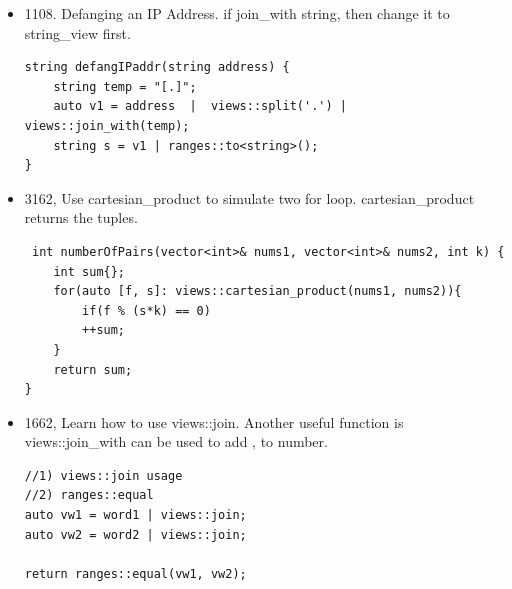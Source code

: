 \documentclass[a4paper,11pt,twoside]{book}
\begin{document}
\begin{itemize}
\begin{lstlisting}
		string v3 = v1 | views::drop(v1.size() -4) | views::chunk(2) | views::join_with('-') | ranges::to<string>();;
		result = v2 + '-' + v3;
		
	}
	else{
		result = v1 | views::chunk(3) | views::join_with('-') | ranges::to<string>();
	}
	return result;
}
\end{lstlisting}

	\item 1108. Defanging an IP Address. if join\_with string, then change it to string\_view first.
\begin{lstlisting}
string defangIPaddr(string address) {
	string temp = "[.]";
	auto v1 = address  |  views::split('.') | views::join_with(temp);
	string s = v1 | ranges::to<string>();
}
\end{lstlisting}

	
	\item 3162, Use cartesian\_product to simulate two for loop. cartesian\_product returns the tuples. 
\begin{lstlisting}
 int numberOfPairs(vector<int>& nums1, vector<int>& nums2, int k) {
	int sum{};
	for(auto [f, s]: views::cartesian_product(nums1, nums2)){
		if(f % (s*k) == 0)
		++sum;
	}
	return sum;
}
\end{lstlisting}
	
	\item 1662, Learn how to use views::join. Another useful function is views::join\_with can be used to add , to number. 
\begin{lstlisting}
//1) views::join usage
//2) ranges::equal 
auto vw1 = word1 | views::join; 
auto vw2 = word2 | views::join;

return ranges::equal(vw1, vw2);
\end{lstlisting}
\end{itemize}
\end{document}
